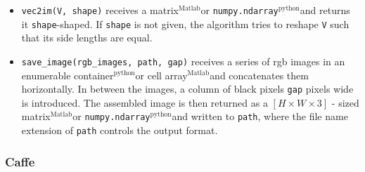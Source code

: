 \documentclass[a4wide]{article}
\newcommand{\mat}{$^\text{Matlab}$}
\newcommand{\py}{$^\text{python}$}
\begin{document}
\begin{itemize}
\begin{itemize}
		\item \texttt{vec2im(V, shape)} receives a matrix\mat or \texttt{numpy.ndarray}\py and returns it \texttt{shape}-shaped. If \texttt{shape} is not given, the algorithm tries to reshape \texttt{V} such that its side lengths are equal.
		\item \texttt{save\_image(rgb\_images, path, gap)} receives a series of rgb images in an enumerable container\py or cell array\mat and concatenates them horizontally. In between the images, a column of black pixels \texttt{gap} pixels wide is introduced. The assembled image is then returned as a  $[H \times W \times 3]$ - sized matrix\mat or \texttt{numpy.ndarray}\py and written to \texttt{path}, where the file name extension of \texttt{path} controls the output format.
	\end{itemize}
\end{itemize}



\subsubsection*{Caffe}
\end{document}
